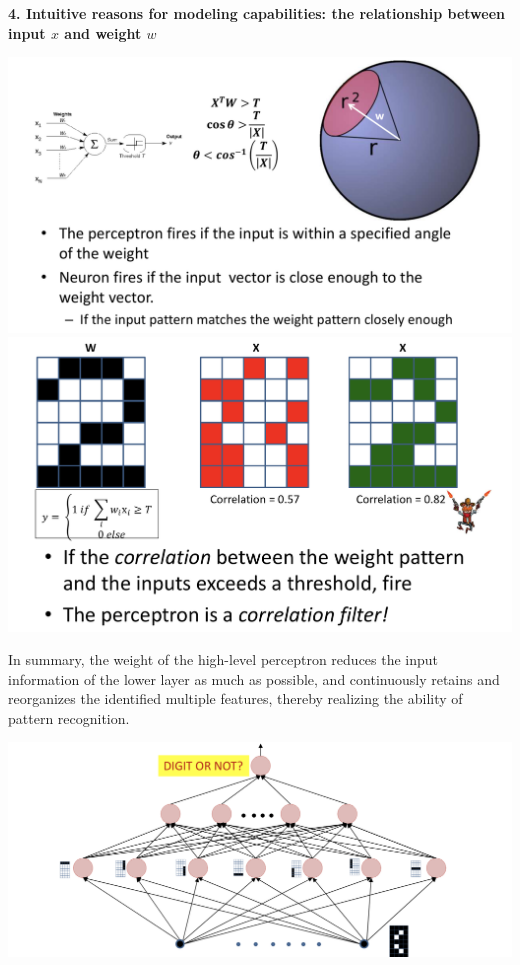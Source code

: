\documentclass{article}
\begin{document}
	
	\textbf{4. Intuitive reasons for modeling capabilities: the relationship between input $x$ and weight $w$}
		
		\includegraphics[scale=0.2]{11.png}
		\includegraphics[scale=0.2]{12.png}
		
		In summary, the weight of the high-level perceptron reduces the input information of the lower layer as much as possible, and continuously retains and reorganizes the identified multiple features, thereby realizing the ability of pattern recognition.
		
		\includegraphics[scale=0.2]{13.png} \\ \\ \\ \\
		
\end{document}
